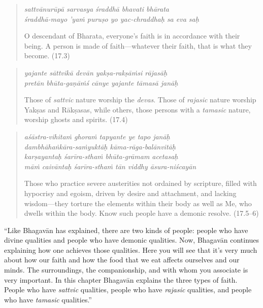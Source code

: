 \documentclass[12pt, twoside, openright]{memoir}
\begin{document}
\par
\begin{verse}
\textit{sattvānurūpā sarvasya śraddhā bhavati bhārata} \\
\textit{śraddhā-mayo ’yaṁ puruṣo yo yac-chraddhaḥ sa eva saḥ}

\noindent O descendant of Bharata, everyone's faith is in accordance with their being. A person is made of faith---whatever their faith, that is what they become. (17.3)
\end{verse}
\par



\par
\begin{verse}
\textit{yajante sāttvikā devān yakṣa-rakṣāṁsi rājasāḥ} \\
\textit{pretān bhūta-gaṇāṁś cānye yajante tāmasā janāḥ}

\noindent Those of \textit{sattvic} nature worship the \textit{devas}. Those of \textit{rajasic} nature worship Yakṣas and Rākṣasas, while others, those persons with a \textit{tamasic} nature, worship ghosts and spirits. (17.4)
\end{verse}
\par



\par
\begin{verse}
\textit{aśāstra-vihitaṁ ghoraṁ tapyante ye tapo janāḥ} \\
\textit{dambhāhaṅkāra-saṁyuktāḥ kāma-rāga-balānvitāḥ} \\
\textit{karṣayantaḥ śarīra-sthaṁ bhūta-grāmam acetasaḥ} \\
\textit{māṁ caivāntaḥ śarīra-sthaṁ tān viddhy āsura-niścayān}

\noindent Those who practice severe austerities not ordained by scripture, filled with hypocrisy and egoism, driven by desire and attachment, and lacking wisdom---they torture the elements within their body as well as Me, who dwells within the body. Know such people have a demonic resolve. (17.5–6)
\end{verse}
\par


\enquote{Like Bhagavān has explained, there are two kinds of people: people who have divine qualities and people who have demonic qualities. Now, Bhagavān continues explaining how one achieves those qualities. Here you will see that it’s very much about how our faith and how the food that we eat affects ourselves and our minds. The surroundings, the companionship, and with whom you associate is very important. In this chapter Bhagavān explains the three types of faith. People who have \textit{sattvic} qualities, people who have \textit{rajasic} qualities, and people who have \textit{tamasic} qualities.}
\end{document}
